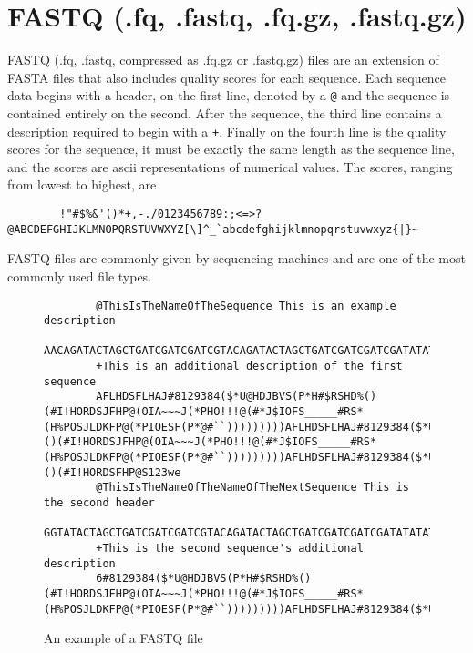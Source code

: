 \documentclass[a4]{article}
\begin{document}
\section{FASTQ (.fq, .fastq, .fq.gz, .fastq.gz)}
	FASTQ (.fq, .fastq, compressed as .fq.gz or .fastq.gz) files are an extension of FASTA files that also includes quality scores for each sequence. Each sequence data begins with a header, on the first line, denoted by a \verb|@| and the sequence is contained entirely on the second. After the sequence, the third line contains a description required to begin with a \verb|+|. Finally on the fourth line is the quality scores for the sequence, it must be exactly the same length as the sequence line, and the scores are ascii representations of numerical values. The scores, ranging from lowest to highest, are  
	\begin{lstlisting}
		!"#$%&'()*+,-./0123456789:;<=>?@ABCDEFGHIJKLMNOPQRSTUVWXYZ[\]^_`abcdefghijklmnopqrstuvwxyz{|}~
	\end{lstlisting}
	FASTQ files are commonly given by sequencing machines and are one of the most commonly used file types. 
	\begin{figure}[h]
		\begin{lstlisting}
		@ThisIsTheNameOfTheSequence This is an example description
		AACAGATACTAGCTGATCGATCGATCGTACAGATACTAGCTGATCGATCGATCGATATATATATGCCGCGATACGTACGTGGTATACTAGCTGATCGATCGATCGTACAGATACTAGCTGATCGATCGATCGATATATATATGCCGCGATACGTACGTAAAACAGATACTAGCTGATCGATCGATCGTACAGATACTAGCTGATCGATCGATCGATATATATATGCCGCGATACGTACGTGGTATACTAGCTGATCGATCGATCGTACAGATACTAGCTGATCGATCGATCGATATATATATGCCGCGATACGTACGTAA
		+This is an additional description of the first sequence
		AFLHDSFLHAJ#8129384($*U@HDJBVS(P*H#$RSHD%()(#I!HORDSJFHP@(OIA~~~J(*PHO!!!@(#*J$IOFS_____#RS*(H%POSJLDKFP@(*PIOESF(P*@#``)))))))))AFLHDSFLHAJ#8129384($*U@HDJBVS(P*H#$RSHD%()(#I!HORDSJFHP@(OIA~~~J(*PHO!!!@(#*J$IOFS_____#RS*(H%POSJLDKFP@(*PIOESF(P*@#``)))))))))AFLHDSFLHAJ#8129384($*U@HDJBVS(P*H#$RSHD%()(#I!HORDSFHP@S123we
		@ThisIsTheNameOfTheNameOfTheNextSequence This is the second header
		GGTATACTAGCTGATCGATCGATCGTACAGATACTAGCTGATCGATCGATCGATATATATATGCCGCGATACGTACGTAAAACAGATACTAGCTGATCGATCGATCGTACAGATACTAGCTGATCGATCGATCGATATATATATGCCGCGATACGTACGT
		+This is the second sequence's additional description
		6#8129384($*U@HDJBVS(P*H#$RSHD%()(#I!HORDSJFHP@(OIA~~~J(*PHO!!!@(#*J$IOFS_____#RS*(H%POSJLDKFP@(*PIOESF(P*@#``)))))))))AFLHDSFLHAJ#8129384($*U@HDJBVS(P*H#$RSH
		\end{lstlisting}
		\caption{An example of a FASTQ file}
	\end{figure}
	
\end{document}
